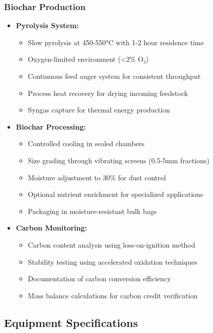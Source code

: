 \subsubsection{Biochar Production}
\begin{itemize}
    \item \textbf{Pyrolysis System:}
    \begin{itemize}
        \item Slow pyrolysis at 450-550°C with 1-2 hour residence time
        \item Oxygen-limited environment (<2\% O₂)
        \item Continuous feed auger system for consistent throughput
        \item Process heat recovery for drying incoming feedstock
        \item Syngas capture for thermal energy production
    \end{itemize}
    
    \item \textbf{Biochar Processing:}
    \begin{itemize}
        \item Controlled cooling in sealed chambers
        \item Size grading through vibrating screens (0.5-5mm fractions)
        \item Moisture adjustment to 30\% for dust control
        \item Optional nutrient enrichment for specialized applications
        \item Packaging in moisture-resistant bulk bags
    \end{itemize}
    
    \item \textbf{Carbon Monitoring:}
    \begin{itemize}
        \item Carbon content analysis using loss-on-ignition method
        \item Stability testing using accelerated oxidation techniques
        \item Documentation of carbon conversion efficiency
        \item Mass balance calculations for carbon credit verification
    \end{itemize}
\end{itemize}

\subsection{Equipment Specifications}

